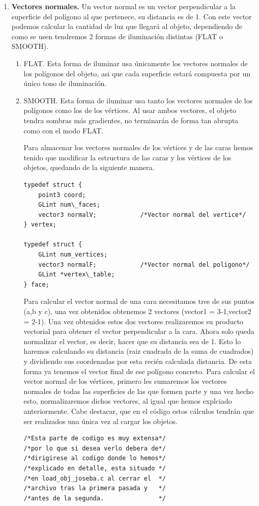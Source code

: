 \documentclass[12pt,a4paper]{article}
\begin{document}
\begin{enumerate}
\begin{enumerate}
\item \textbf{Vectores normales.}
Un vector normal es un vector perpendicular a la superficie del polígono al que pertenece, su distancia es de 1. Con este vector podemos calcular la cantidad de luz que llegará al objeto, dependiendo de como se usen tendremos 2 formas de iluminación distintas (FLAT o SMOOTH). \newline
\begin{enumerate}
\item {FLAT.}
Esta forma de iluminar usa únicamente los vectores normales de los polígonos del objeto, asi que cada superficie estará compuesta por un único tono de iluminación.
\item {SMOOTH.}
Esta forma de iluminar usa tanto los vectores normales de los polígonos como los de los vértices. Al usar ambos vectores, el objeto tendra sombras más gradientes, no terminarán de forma tan abrupta como con el modo FLAT.\newline

Para almacenar los vectores normales de los vértices y de las caras hemos tenido que modificar la estructura de las caras y los vértices de los objetos, quedando de la siguiente manera.
\begin{lstlisting}
typedef struct {
    point3 coord;    
    GLint num\_faces;  
    vector3 normalV;			/*Vector normal del vertice*/
} vertex;

typedef struct {
    GLint num_vertices;   
    vector3 normalF;			/*Vector normal del poligono*/
    GLint *vertex\_table; 
} face;
\end{lstlisting}

Para calcular el vector normal de una cara necesitamos tres de sus puntos (a,b y c), una vez obtenidos obtenemos 2 vectores (vector1 = 3-1,vector2 = 2-1). Una vez obtenidos estos dos vectores realizaremos su producto vectorial para obtener el vector perpendicular a la cara.\newline
Ahora solo queda normalizar el vector, es decir, hacer que su distancia sea de 1. Esto lo haremos calculando su distancia (raiz cuadrada de la suma de cuadrados) y dividiendo sus coordenadas por esta recién calculada distancia. De esta forma ya tenemos el vector final de ese polígono concreto.\newline
Para calcular el vector normal de los vértices, primero les sumaremos los vectores normales de todas las superficies de las que formen parte y una vez hecho esto, normalizaremos dichos vectores, al igual que hemos explciado anteriormente.\newline
Cabe destacar, que en el código estos cálculos tendrán que ser realizados una única vez al cargar los objetos. 
\begin{lstlisting}
/*Esta parte de codigo es muy extensa*/
/*por lo que si desea verlo debera de*/
/*dirigirese al codigo donde lo hemos*/
/*explicado en detalle, esta situado */
/*en load_obj_joseba.c al cerrar el  */
/*archivo tras la primera pasada y   */
/*antes de la segunda.               */
\end{lstlisting}


\end{enumerate}
\end{enumerate}
\end{enumerate}
\end{document}

